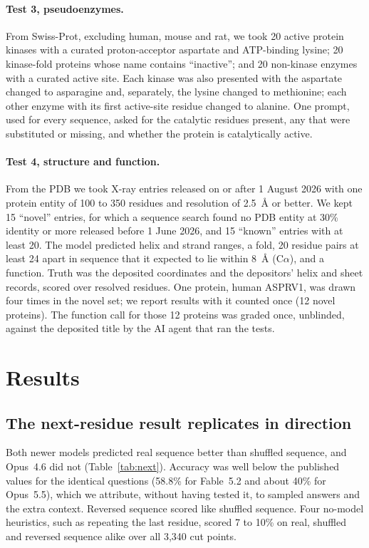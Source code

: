 \documentclass[11pt]{article}
\begin{document}
\paragraph{Test 3, pseudoenzymes.} From Swiss-Prot, excluding human, mouse and rat, we took 20 active
protein kinases with a curated proton-acceptor aspartate and ATP-binding lysine; 20 kinase-fold proteins
whose name contains ``inactive''; and 20 non-kinase enzymes with a curated active site. Each kinase was
also presented with the aspartate changed to asparagine and, separately, the lysine changed to
methionine; each other enzyme with its first active-site residue changed to alanine. One prompt, used for
every sequence, asked for the catalytic residues present, any that were substituted or missing, and
whether the protein is catalytically active.

\paragraph{Test 4, structure and function.} From the PDB \citep{rcsb} we took X-ray entries released on
or after 1 August 2026 with one protein entity of 100 to 350 residues and resolution of 2.5~\AA{} or
better. We kept 15 ``novel'' entries, for which a sequence search found no PDB entity at 30\% identity
or more released before 1 June 2026, and 15 ``known'' entries with at least 20. The model predicted helix
and strand ranges, a fold, 20 residue pairs at least 24 apart in sequence that it expected to lie within
8~\AA{} (C$\alpha$), and a function. Truth was the deposited coordinates and the depositors' helix and
sheet records, scored over resolved residues. One protein, human ASPRV1, was drawn four times in the novel
set; we report results with it counted once (12 novel proteins). The function call for those 12 proteins was graded once, unblinded, against the
deposited title by the AI agent that ran the tests.

\section{Results}

\subsection{The next-residue result replicates in direction}

Both newer models predicted real sequence better than shuffled sequence, and Opus~4.6 did not
(Table~\ref{tab:next}). Accuracy was well below the published values for the identical questions (58.8\%
for Fable~5.2 and about 40\% for Opus~5.5), which we attribute, without having tested it, to sampled
answers and the extra context. Reversed sequence scored like shuffled sequence. Four no-model heuristics,
such as repeating the last residue, scored 7 to 10\% on real, shuffled and reversed sequence alike over
all 3,340 cut points.
\end{document}

